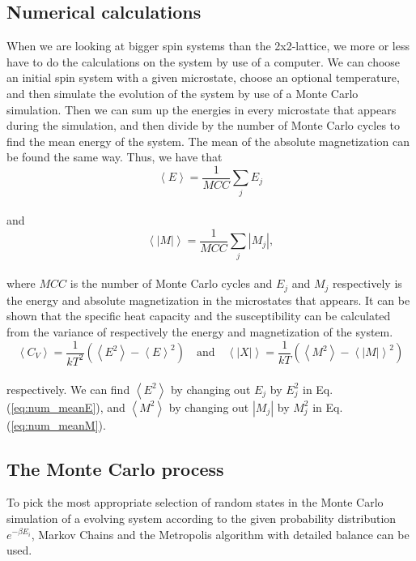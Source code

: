 \documentclass[12pt]{article}
\begin{document}
\begin{flushleft}
\subsection{Numerical calculations}
When we are looking at bigger spin systems than the 2x2-lattice, we more or less have to do the calculations on the system by use of a computer. We can choose an initial spin system with a given microstate, choose an optional temperature, and then simulate the evolution of the system by use of a Monte Carlo simulation. Then we can sum up the energies in every microstate that appears during the simulation, and then divide by the number of Monte Carlo cycles to find the mean energy of the system. The mean of the absolute magnetization can be found the same way. Thus, we have that
\vspace{5mm}
\begin{equation}\label{eq:num_meanE}
\left<E\right> = \frac{1}{MCC}\sum\limits_j E_j
\end{equation}\\
and\\
\begin{equation}\label{eq:num_meanM}
\left<|M|\right> = \frac{1}{MCC}\sum\limits_j |M_j| ,
\end{equation}\\
\vspace{5mm}
where $MCC$ is the number of Monte Carlo cycles and $E_j$ and $M_j$ respectively is the energy and absolute magnetization in the microstates that appears. It can be shown that the specific heat capacity and the susceptibility can be calculated from the variance of respectively the energy and magnetization of the system.
\vspace{5mm}
$$\left<C_V\right> = \frac{1}{kT^2}\left(\left<E^2\right> - \left<E\right>^2\right)\quad\text{and}\quad \left<|X|\right> = \frac{1}{kT}\left(\left<M^2\right> - \left<|M|\right>^2\right)$$\\
\vspace{5mm}
respectively. We can find $\left<E^2\right>$ by changing out $E_j$ by $E_j^2$ in Eq. (\ref{eq:num_meanE}), and $\left<M^2\right>$ by changing out $|M_j|$ by $M_j^2$ in Eq. (\ref{eq:num_meanM}). 

\subsection{The Monte Carlo process}
To pick the most appropriate selection of random states in the Monte Carlo simulation of a evolving system according to the given probability distribution $e^{-\beta E_i}$, Markov Chains and the Metropolis algorithm with detailed balance can be used.

\end{flushleft}
\end{document}
